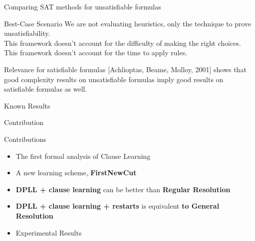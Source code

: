 \documentclass[page number]{beamer}
\begin{document}
\begin{frame}{Comparing SAT methods for unsatisfiable formulas}
  \begin{exampleblock}{Best-Case Scenario}
    We are not evaluating heuristics, only the technique to prove unsatisfiability.\\
    This framework doesn't account for the difficulty of making the right choices.\\
    This framework doesn't account for the time to apply rules.
  \end{exampleblock}
  \vfill
  \begin{block}{Relevance for satisfiable formulas}
    [Achlioptas, Beame, Molloy, 2001] shows that good complexity results on unsatisfiable formulas imply good results on satisfiable formulas as well.
  \end{block}
    
\end{frame}

\begin{frame}{Known Results}
  \begin{center}
  \end{center}
\end{frame}
  
\begin{frame}{Contribution}
  \begin{exampleblock}{Contributions}
    \begin{itemize}
    \item The first formal analysis of Clause Learning
    \item A new learning scheme, \textbf{FirstNewCut}
    \item \textbf{DPLL + clause learning} can be better than \textbf{Regular Resolution}
    \item \textbf{DPLL + clause learning + restarts} is equivalent \textbf{to General Resolution}
    \item Experimental Results
    \end{itemize}
  \end{exampleblock}
\end{frame}
\end{document}
